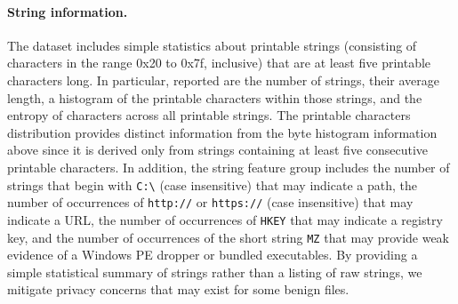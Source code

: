 \paragraph{String information.} The dataset includes simple statistics about printable strings (consisting of characters in the range 0x20 to 0x7f, inclusive) that are at least five printable characters long.  In particular, reported are the number of strings, their average length, a histogram of the printable characters within those strings, and the entropy of characters across all printable strings.  The printable characters distribution provides distinct information from the byte histogram information above since it is derived only from strings containing at least five consecutive printable characters.  In addition, the string feature group includes the number of strings that begin with \texttt{C:\textbackslash} (case insensitive) that may indicate a path, the number of occurrences of \texttt{http://} or \texttt{https://} (case insensitive) that may indicate a URL, the number of occurrences of \texttt{HKEY\textunderscore} that may indicate a registry key, and the number of occurrences of the short string \texttt{MZ} that may provide weak evidence of a Windows PE dropper or bundled executables.  By providing a simple statistical summary of strings rather than a listing of raw strings, we mitigate privacy concerns that may exist for some benign files.






